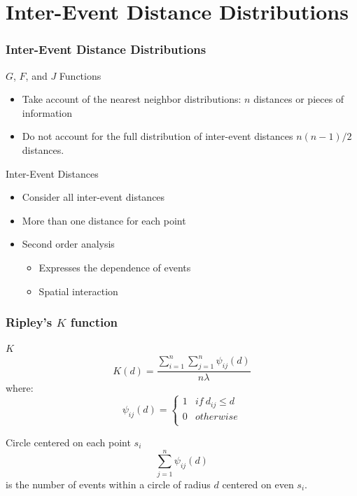 \documentclass[nototal,handout]{beamer}
\begin{document}
 \section{Inter-Event Distance Distributions}
 \begin{frame}[<+->]
   \frametitle{Inter-Event Distance Distributions}
   \begin{block}{$G$, $F$, and $J$ Functions}
     \begin{itemize}
       \item Take account of the nearest neighbor distributions: $n$ distances
	 or pieces of
	 information
       \item Do not account for the full distribution of inter-event distances
	 $n(n-1)/2$ distances.
     \end{itemize}
\end{block}
     \begin{block}{Inter-Event Distances}
       \begin{itemize}
	 \item Consider all inter-event distances
	 \item More than one distance for each point
	 \item Second order analysis
	   \begin{itemize}
	     \item Expresses the dependence of events
	     \item Spatial interaction
	   \end{itemize}
       \end{itemize}
     \end{block}
  \end{frame}

  \begin{frame}[<+->]
    \frametitle{Ripley's $K$ function}
    \begin{block}{$K$}
      \begin{equation}
	K(d) = \frac{\sum_{i=1}^n \sum_{j=1}^n \psi_{ij}(d)}{n\lambda}
      \end{equation}
where:
      \begin{equation}
	\psi_{ij}(d) = \left\{ \begin{array}{ll}
	  1& if \ d_{ij} \le d \\
	  0&otherwise\\
	\end{array} \right.
      \end{equation}

     \end{block}
     \begin{block}{Circle centered on each point $s_i$}
       \begin{equation}
	 \sum_{j=1}^n \psi_{ij}(d)
       \end{equation}
       is the number of events within a circle of radius $d$ centered on even
       $s_i$.
     \end{block}
   \end{frame}
\end{document}

